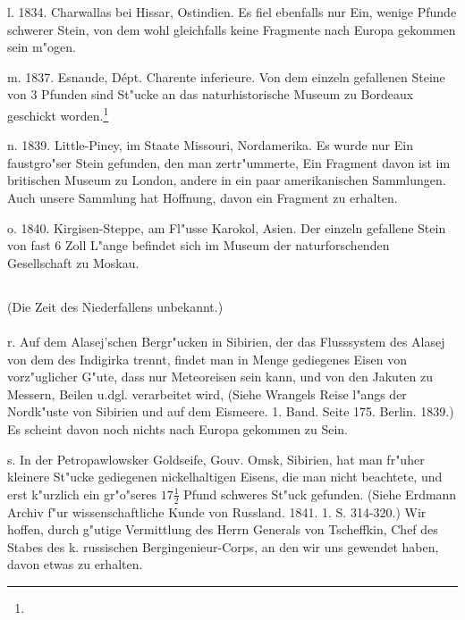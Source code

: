 \documentclass[a4paper, 11pt, oneside, polutonikogreek, german]{article}
\begin{document}
l. 1834. Charwallas bei Hissar, Ostindien. Es fiel ebenfalls nur Ein, wenige Pfunde schwerer Stein, von dem wohl gleichfalls keine Fragmente nach Europa gekommen sein m"ogen.

m. 1837. Esnaude, Dépt. Charente inferieure. Von dem einzeln gefallenen Steine von 3 Pfunden sind St"ucke an das naturhistorische Museum zu Bordeaux geschickt worden.\footnote{}

n. 1839. Little-Piney, im Staate Missouri, Nordamerika. Es wurde nur Ein faustgro"ser Stein gefunden, den man zertr"ummerte, Ein Fragment davon ist im britischen Museum zu London, andere in ein paar amerikanischen Sammlungen. Auch unsere Sammlung hat Hoffnung, davon ein Fragment zu erhalten.

o. 1840. Kirgisen-Steppe, am Fl"usse Karokol, Asien. Der einzeln gefallene Stein von fast 6 Zoll L"ange befindet sich im Museum der naturforschenden Gesellschaft zu Moskau.
\subsection{}
\begin{center}
(Die Zeit des Niederfallens unbekannt.)
\end{center}
\paragraph{}
r. Auf dem Alasej'schen Bergr"ucken in Sibirien, der das Flusssystem des Alasej von dem des Indigirka trennt, findet man in Menge gediegenes Eisen von vorz"uglicher G"ute, dass nur Meteoreisen sein kann, und von den Jakuten zu Messern, Beilen u.dgl. verarbeitet wird, (Siehe Wrangels Reise l"angs der Nordk"uste von Sibirien und auf dem Eismeere. 1. Band. Seite 175. Berlin. 1839.) Es scheint davon noch nichts nach Europa gekommen zu Sein.

s. In der Petropawlowsker Goldseife, Gouv. Omsk, Sibirien, hat man fr"uher kleinere St"ucke gediegenen nickelhaltigen Eisens, die man nicht beachtete, und erst k"urzlich ein gr"o"seres $17\frac{1}{2}$ Pfund schweres St"uck gefunden. (Siehe Erdmann Archiv f"ur wissenschaftliche Kunde von Russland. 1841. 1. S. 314-320.) Wir hoffen, durch g"utige Vermittlung des Herrn Generals von Tscheffkin, Chef des Stabes des k. russischen Bergingenieur-Corps, an den wir uns gewendet haben, davon etwas zu erhalten.
\end{document}

